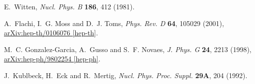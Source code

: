 \documentclass{ws-mpla}
\renewcommand{\(}{\left(}
\renewcommand{\)}{\right)}
\renewcommand{\[}{\left[}
\renewcommand{\]}{\right]}
\begin{document}
\begin{thebibliography}{10}
E.~Witten, {\em Nucl. Phys. B} {\bf 186},   412  (1981).

A.~Flachi, I.~G. Moss and D.~J. Toms, {\em Phys. Rev. D} {\bf 64},   105029
  (2001), \href{http://arxiv.org/abs/hep-th/0106076}{{\ttfamily
  arXiv:hep-th/0106076 [hep-th]}}.

M.~C. Gonzalez-Garcia, A.~Gusso and S.~F. Novaes, {\em J. Phys. G} {\bf 24},
  2213  (1998), \href{http://arxiv.org/abs/hep-ph/9802254}{{\ttfamily
  arXiv:hep-ph/9802254 [hep-ph]}}.

J.~Kublbeck, H.~Eck and R.~Mertig, {\em Nucl. Phys. Proc. Suppl.} {\bf 29A},
  204  (1992).

\end{thebibliography}
\end{document}

